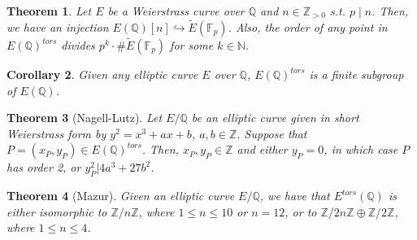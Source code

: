 \documentclass{article}
\newcommand{\numberset}{\mathbb}
\newcommand{\N}{\numberset{N}}
\newcommand{\Z}{\numberset{Z}}
\newcommand{\Q}{\numberset{Q}}
\newcommand{\F}{\numberset{F}}
\theoremstyle{plain}
\newtheorem{thm}{Theorem}
\newtheorem{cor}[thm]{Corollary}
\theoremstyle{definition}
\begin{document}
\begin{thm}
    Let $E$ be a Weierstrass curve over $\Q$ and $n\in\Z_{>0}$ s.t. $p\mid n$.
    Then, we have an injection $E(\Q)[n]\hookrightarrow\tilde{E}(\F_p)$. Also,
    the order of any point in $E(\Q)^{tors}$ divides
    $p^k\cdot \#\tilde{E}(\F_p)$ for some $k\in\N$.
\end{thm}

\begin{cor}
    Given any elliptic curve $E$ over $\Q$, $E(\Q)^{tors}$ is a finite subgroup
    of $E(\Q)$.
\end{cor}

\begin{thm}[Nagell-Lutz]
    Let $E/\Q$ be an elliptic curve given in short Weierstrass form by
    $y^2=x^3+ax+b$, $a,b\in\Z$. Suppose that $P=(x_P,y_P)\in E(\Q)^{tors}$.
    Then, $x_P,y_P\in\Z$ and either $y_P=0$, in which case $P$ has order 2, or
    $y_P^2|4a^3+27b^2$.
\end{thm}

\begin{thm}[Mazur]
    Given an elliptic curve $E/\Q$, we have that $E^{tors}(\Q)$ is either
    isomorphic to $\Z/n\Z$, where $1\leq n\leq 10$ or $n=12$, or to
    $\Z/2n\Z\oplus\Z/2\Z$, where $1\leq n\leq 4$.
\end{thm}

\printbibliography
\end{document}
